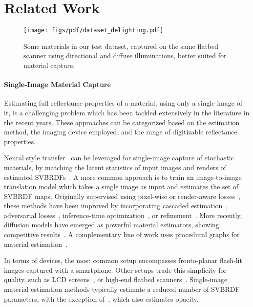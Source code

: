\section{Related Work}
\begin{figure*}[tb!]
	\centering
	\texttt{[image: figs/pdf/dataset\_delighting.pdf]}
	\caption{Some materials in our test dataset, captured on the same flatbed scanner using directional and diffuse illuminations, better suited for material capture. }
	\label{fig:dataset_delighting}
\end{figure*}

\label{sec:related_work}

\paragraph*{\textbf{Single-Image Material Capture}} Estimating full reflectance properties of a material, using only a single image of it, is a challenging problem which has been tackled extensively in the literature in the recent years. These approaches can be categorized based on the estimation method, the imaging device employed, and the range of digitizable reflectance properties.


Neural style transfer~\cite{gatys2015neural} can be leveraged for single-image capture of stochastic materials, by matching the latent statistics of input images and renders of estimated SVBRDFs~\cite{henzler2021neuralmaterial, aittala2016reflectance}. A more common approach is to train an image-to-image translation model which takes a single image as input and estimates the set of SVBRDF maps. Originally supervised using pixel-wise or render-aware losses~\cite{deschaintre2018single,li2018materials,ye2018single,gao2019deep}, these methods have been improved by incorporating cascaded estimation~\cite{li2018learning, sang2020single}, adversarial losses~\cite{rodriguezpardo2023UMat, wen2022svbrdf, guo2021highlight,zhou2021adversarial,zhou2022tilegen,vecchio2021surfacenet},  inference-time optimization~\cite{gao2019deep}, or refinement~\cite{luo2024single}. More recently, diffusion models have emerged as powerful material estimators, showing competitive results~\cite{vecchio2023controlmat,vecchio2023matfuse,yuan2024diffmat,Sartor:2023:MFA}. A complementary line of work uses procedural graphs for material estimation~\cite{shi2020match, hu2022inverse, guo2020bayesian,jin2022woven}.


In terms of devices, the most common setup encompasses fronto-planar flash-lit images captured with a smartphone. Other setups trade this simplicity for quality, such as LCD screens~\cite{aittala2013practical,zhang2023deep,xu2023unified}, or high-end flatbed scanners~\cite{rodriguezpardo2023UMat}. Single-image material estimation methods typically estimate a reduced number of SVBRDF parameters, with the exception of~\cite{vecchio2023controlmat}, which also estimates opacity. 

